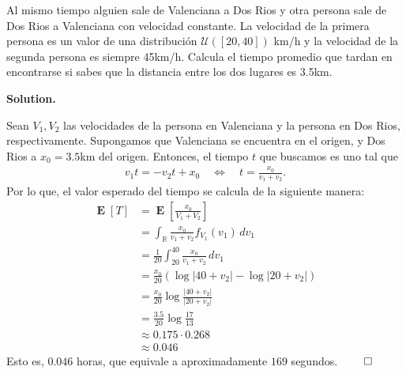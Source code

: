 \documentclass{article}
\theoremstyle{problemstyle}
\newenvironment{solution}{%
  \begin{mdframed}[linewidth=0.8pt,linecolor=Gray,backgroundcolor=Gray!5,roundcorner=5pt]%
  \noindent\textbf{Solution.}%
}{%
\hfill $ \qed $ 
  \end{mdframed}%
}
\newcommand{\R}{\mathbb R}
\newcommand{\abs}[1]{\lvert #1 \rvert}
\DeclareMathOperator{\E}{\mathbf{E}}
\begin{document}
\begin{problem}
Al mismo tiempo alguien sale de Valenciana a Dos Rios y otra persona sale de
Dos Rios a Valenciana con velocidad constante. La velocidad de la primera
persona es un valor de una distribuci\'on $ \mathcal U([20, 40])$ km/h y la
velocidad de la segunda persona es siempre 45km/h. Calcula el tiempo promedio
que tardan en encontrarse si sabes que la distancia entre los dos lugares es
3.5km.
\end{problem}
\begin{solution}
	Sean $ V_1, V_2 $ las velocidades de la persona en Valenciana y la persona en Dos Rios, respectivamente. Supongamos que Valenciana se encuentra en el origen, y Dos Rios a $ x_0 = 3.5 $km del origen. Entonces, el tiempo $ t $ que buscamos es uno tal que
	\begin{align*}
		v_1 t = -v_2 t + x_0\quad \iff \quad t = \frac{x_0}{v_1+v_2}.
	\end{align*}
	Por lo que, el valor esperado del tiempo se calcula de la siguiente manera:
	\begin{align*}
		\E[T] & = \E\left[\frac{x_0}{V_1+V_2}\right]                    \\
		      & = \int_{\R} \frac{x_0}{v_1+v_2} f_{V_1}(v_1)\,dv_1      \\
		      & = \frac{1}{20}\int_{20}^{40} \frac{x_0}{v_1+v_2} \,dv_1 \\
          & = \frac{x_0}{20} \left(\log\abs{40+v_2}-\log\abs{20+v_2}\right)  \\
		      & = \frac{x_0}{20} \log\frac{\abs{40+v_2}}{\abs{20+v_2}}  \\
		      & = \frac{3.5}{20}\log \frac{17}{13}                      \\
		      & \approx  0.175\cdot 0.268                               \\
		      & \approx 0.046
	\end{align*}
	Esto es, $ 0.046 $ horas, que equivale a aproximadamente $ 169 $ segundos.
\end{solution}
\end{document}
